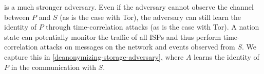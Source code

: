  is a much stronger adversary.
Even if the adversary cannot observe the channel between \(P\) and \(S\) (as is 
the case with Tor), the adversary can still learn the identity of \(P\) through 
\eg time-correlation attacks (as is the case with Tor).
A nation state can potentially monitor the traffic of all \acp{ISP} and thus 
perform time-correlation attacks on messages on the network and events observed 
from \(S\).
We capture this in \cref{deanonymizing-storage-adversary}, where \(A\) learns 
the identity of \(P\) in the communication with \(S\).

